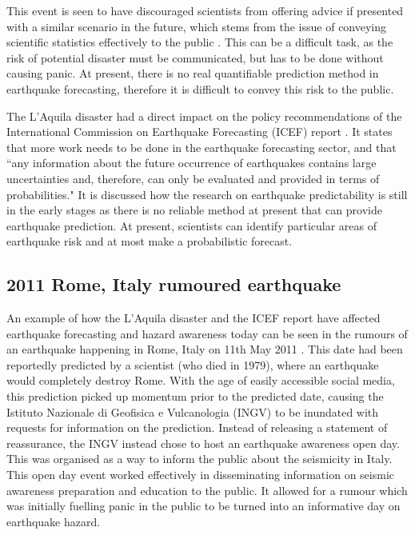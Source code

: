 \documentclass[12pt]{report}
\begin{document}
This event is seen to have discouraged scientists from offering advice if presented with a similar scenario in the future, which stems from the issue of conveying scientific statistics effectively to the public \citep{AGU2010, Yeo2014}. This can be a difficult task, as the risk of potential disaster must be communicated, but has to be done without causing panic. At present, there is no real quantifiable prediction method in earthquake forecasting, therefore it is difficult to convey this risk to the public. 

The L'Aquila disaster had a direct impact on the policy recommendations of the International Commission on Earthquake Forecasting (ICEF) report \citep{Jordan2011}. It states that more work needs to be done in the earthquake forecasting sector, and that ``any information about the future occurrence of earthquakes contains large uncertainties and, therefore, can only be evaluated and provided in terms of probabilities." It is discussed how the research on earthquake predictability is still in the early stages as there is no reliable method at present that can provide earthquake prediction. At present, scientists can identify particular areas of earthquake risk and at most make a probabilistic forecast. 

\subsection{2011 Rome, Italy rumoured earthquake}
An example of how the L'Aquila disaster and the ICEF report have affected earthquake forecasting and hazard awareness today can be seen in the rumours of an earthquake happening in Rome, Italy on 11th May 2011 \citep{Nostro2012}. This date had been reportedly predicted by a scientist (who died in 1979), where an earthquake would completely destroy Rome. With the age of easily accessible social media, this prediction picked up momentum prior to the predicted date, causing the Istituto Nazionale di Geofisica e Vulcanologia (INGV) to be inundated with requests for information on the prediction. Instead of releasing a statement of reassurance, the INGV instead chose to host an earthquake awareness open day. This was organised as a way to inform the public about the seismicity in Italy. This open day event worked effectively in disseminating information on seismic awareness preparation and education to the public. It allowed for a rumour which was initially fuelling panic in the public to be turned into an informative day on earthquake hazard.
\end{document}
